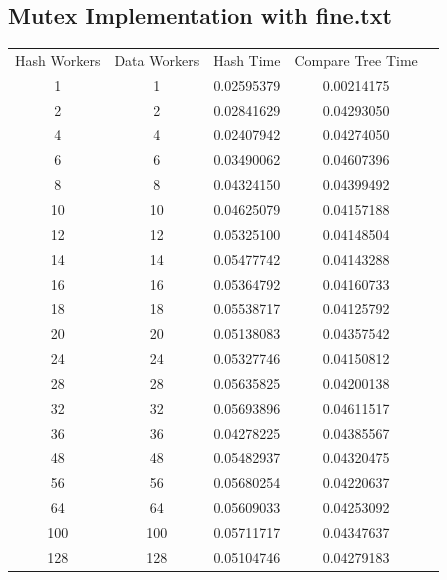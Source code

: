 \documentclass[letterpaper,12pt]{article}
\theoremstyle{remark}
\begin{document}
\subsection*{Mutex Implementation  with fine.txt}
\begin{tabular}{ccccc}

Hash Workers & Data Workers & Hash Time & Compare Tree Time  \\
1 & 1  & 0.02595379 & 0.00214175  \\
2 & 2 & 0.02841629 & 0.04293050 \\
4 & 4 & 0.02407942 & 0.04274050 \\
6 & 6 & 0.03490062 & 0.04607396 \\
8 & 8 & 0.04324150 & 0.04399492 \\
10 & 10 & 0.04625079 & 0.04157188 \\
12 & 12 & 0.05325100 & 0.04148504 \\
14 & 14 & 0.05477742 & 0.04143288 \\
16 & 16 & 0.05364792 & 0.04160733 \\
18 & 18 & 0.05538717 & 0.04125792 \\
20 & 20 & 0.05138083 & 0.04357542 \\
24 & 24 & 0.05327746 & 0.04150812 \\
28 & 28 & 0.05635825 & 0.04200138 \\
32 & 32 & 0.05693896 & 0.04611517 \\
36 & 36 & 0.04278225 & 0.04385567 \\
48 & 48 & 0.05482937 & 0.04320475 \\
56 & 56 & 0.05680254 & 0.04220637 \\
64 & 64 & 0.05609033 & 0.04253092 \\
100 & 100 & 0.05711717 & 0.04347637 \\
128 & 128 & 0.05104746 & 0.04279183 \\


\end{tabular}
\end{document}
